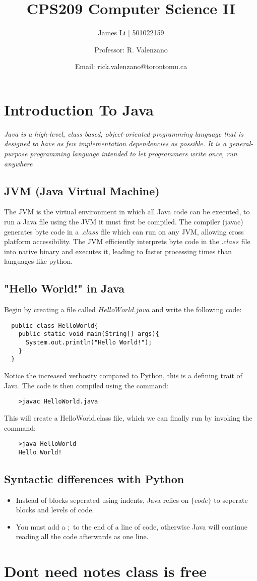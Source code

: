 \documentclass[a4paper]{article}
\title{CPS209 Computer Science II}
\author{James Li | 501022159 \and Professor: R. Valenzano\and Email: rick.valenzano@torontomu.ca}
\date{}
\begin{document}
  \maketitle
  \tableofcontents
  \newpage
  \section{Introduction To Java} 
  \textit{Java is a high-level, class-based, object-oriented programming language that is designed to have as few implementation dependencies as possible. It is a general-purpose programming language intended to let programmers write once, run anywhere}
  \subsection{JVM (Java Virtual Machine)}
  The JVM is the virtual environment in which all Java code can be executed, to run a Java file using the JVM it must first be compiled. The compiler (javac) generates byte code in a $.class$ file which can run on any JVM, allowing cross platform accessibility. The JVM efficiently interprets byte code in the $.class$ file into native binary and executes it, leading to faster processing times than languages like python.
  \subsection{"Hello World!" in Java}
  Begin by creating a file called $HelloWorld.java$ and write the following code:
  \begin{lstlisting}
  public class HelloWorld{
    public static void main(String[] args){
      System.out.println("Hello World!");
    }
  }
  \end{lstlisting}
  Notice the increased verbosity compared to Python, this is a defining trait of Java.
  The code is then compiled using the command:
  \begin{lstlisting}
    >javac HelloWorld.java
  \end{lstlisting}
  This will create a HelloWorld.class file, which we can finally run by invoking the command:
  \begin{lstlisting}
    >java HelloWorld
    Hello World!
  \end{lstlisting}
  \subsection{Syntactic differences with Python}
  \begin{itemize}
    \item Instead of blocks seperated using indents, Java relies on $\{code\}$ to seperate blocks and levels of code.
    \item You must add a $;$ to the end of a line of code, otherwise Java will continue reading all the code afterwards as one line.
  \end{itemize}
  
  \section{Dont need notes class is free} 
  
\end{document}
